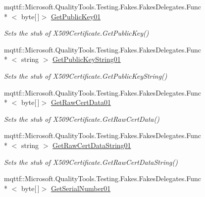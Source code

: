 \begin{DoxyCompactItemize}
mqttf\-::\-Microsoft.\-Quality\-Tools.\-Testing.\-Fakes.\-Fakes\-Delegates.\-Func\\*
$<$ byte\mbox{[}$\,$\mbox{]}$>$ \hyperlink{class_system_1_1_security_1_1_cryptography_1_1_x509_certificates_1_1_fakes_1_1_stub_x509_certificate_abd76a7a1ed6009a3acf436fdab5a49a0}{Get\-Public\-Key01}
\begin{DoxyCompactList}\small\item\em Sets the stub of X509\-Certificate.\-Get\-Public\-Key()\end{DoxyCompactList}\item 
mqttf\-::\-Microsoft.\-Quality\-Tools.\-Testing.\-Fakes.\-Fakes\-Delegates.\-Func\\*
$<$ string $>$ \hyperlink{class_system_1_1_security_1_1_cryptography_1_1_x509_certificates_1_1_fakes_1_1_stub_x509_certificate_a5743be7408561e29b0ec1aeda3e9c6db}{Get\-Public\-Key\-String01}
\begin{DoxyCompactList}\small\item\em Sets the stub of X509\-Certificate.\-Get\-Public\-Key\-String()\end{DoxyCompactList}\item 
mqttf\-::\-Microsoft.\-Quality\-Tools.\-Testing.\-Fakes.\-Fakes\-Delegates.\-Func\\*
$<$ byte\mbox{[}$\,$\mbox{]}$>$ \hyperlink{class_system_1_1_security_1_1_cryptography_1_1_x509_certificates_1_1_fakes_1_1_stub_x509_certificate_a621241b1bd84719ef209ef636413f92a}{Get\-Raw\-Cert\-Data01}
\begin{DoxyCompactList}\small\item\em Sets the stub of X509\-Certificate.\-Get\-Raw\-Cert\-Data()\end{DoxyCompactList}\item 
mqttf\-::\-Microsoft.\-Quality\-Tools.\-Testing.\-Fakes.\-Fakes\-Delegates.\-Func\\*
$<$ string $>$ \hyperlink{class_system_1_1_security_1_1_cryptography_1_1_x509_certificates_1_1_fakes_1_1_stub_x509_certificate_a13a5cbd7c139285b12ed81cc6f49e938}{Get\-Raw\-Cert\-Data\-String01}
\begin{DoxyCompactList}\small\item\em Sets the stub of X509\-Certificate.\-Get\-Raw\-Cert\-Data\-String()\end{DoxyCompactList}\item 
mqttf\-::\-Microsoft.\-Quality\-Tools.\-Testing.\-Fakes.\-Fakes\-Delegates.\-Func\\*
$<$ byte\mbox{[}$\,$\mbox{]}$>$ \hyperlink{class_system_1_1_security_1_1_cryptography_1_1_x509_certificates_1_1_fakes_1_1_stub_x509_certificate_a4cf3999ab305733632eb553804bbe2a3}{Get\-Serial\-Number01}

\end{DoxyCompactItemize}

